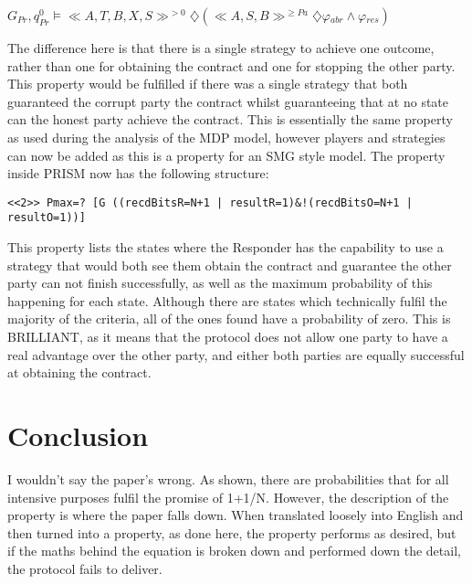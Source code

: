 \documentclass{l4proj}
\begin{document}
$ G{_{Pr}},q_{Pr}^{0}\models  \ll A, T, B, X, S \gg ^{>0} \diamondsuit (\ll A, S, B \gg^{\ge Pa} \diamondsuit \varphi{_{abr}} \wedge \varphi{_{res}}) $

The difference here is that there is a single strategy to achieve one outcome, rather than one for obtaining the contract and one for stopping the other party. This property would be fulfilled if there was a single strategy that both guaranteed the corrupt party the contract whilst guaranteeing that at no state can the honest party achieve the contract. This is essentially the same property as used during the analysis of the MDP model, however players and strategies can now be added as this is a property for an SMG style model. The property inside PRISM now has the following structure:
\begin{lstlisting}
<<2>> Pmax=? [G ((recdBitsR=N+1 | resultR=1)&!(recdBitsO=N+1 | resultO=1))]
\end{lstlisting}

This property lists the states where the Responder has the capability to use a strategy that would both see them obtain the contract and guarantee the other party can not finish successfully, as well as the maximum probability of this happening for each state. Although there are states which technically fulfil the majority of the criteria, all of the ones found have a probability of zero. This is BRILLIANT, as it means that the protocol does not allow one party to have a real advantage over the other party, and either both parties are equally successful at obtaining the contract. 



\chapter{Conclusion}
I wouldn't say the paper's wrong. As shown, there are probabilities that for all intensive purposes fulfil the promise of 1+1/N. However, the description of the property is where the paper falls down. When translated loosely into English and then turned into a property, as done here, the property performs as desired, but if the maths behind the equation is broken down and performed down the detail, the protocol fails to deliver.
\end{document}
